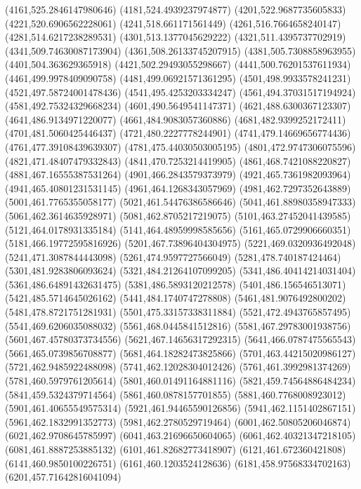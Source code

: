 {(4161,525.2846147980646)
(4181,524.4939237974877)
(4201,522.9687735605833)
(4221,520.6906562228061)
(4241,518.661171561449)
(4261,516.7664658240147)
(4281,514.6217238289531)
(4301,513.1377045629222)
(4321,511.4395737702919)
(4341,509.74630087173904)
(4361,508.26133745207915)
(4381,505.7308858963955)
(4401,504.363629365918)
(4421,502.29493055298667)
(4441,500.76201537611934)
(4461,499.9978409090758)
(4481,499.06921571361295)
(4501,498.9933578241231)
(4521,497.58724001478436)
(4541,495.4253203334247)
(4561,494.37031517194924)
(4581,492.75324329668234)
(4601,490.5649541147371)
(4621,488.6300367123307)
(4641,486.9134971220077)
(4661,484.9083057360886)
(4681,482.9399252172411)
(4701,481.5060425446437)
(4721,480.2227778244901)
(4741,479.14669656774436)
(4761,477.39108439639307)
(4781,475.44030503005195)
(4801,472.9747306075596)
(4821,471.48407479332843)
(4841,470.7253214419905)
(4861,468.7421088220827)
(4881,467.16555387531264)
(4901,466.2843579373979)
(4921,465.7361982093964)
(4941,465.40801231531145)
(4961,464.1268343057969)
(4981,462.7297352643889)
(5001,461.7765355058177)
(5021,461.54476386586646)
(5041,461.88980358947333)
(5061,462.3614635928971)
(5081,462.8705217219075)
(5101,463.27452041439585)
(5121,464.0178931335184)
(5141,464.48959998585656)
(5161,465.0729906660351)
(5181,466.19772595816926)
(5201,467.73896404304975)
(5221,469.0320936492048)
(5241,471.3087844443098)
(5261,474.9597727566049)
(5281,478.740187424464)
(5301,481.9283806093624)
(5321,484.21264107099205)
(5341,486.40414214031404)
(5361,486.64891432631475)
(5381,486.5893120212578)
(5401,486.156546513071)
(5421,485.5714645026162)
(5441,484.1740747278808)
(5461,481.9076492800202)
(5481,478.8721751281931)
(5501,475.33157338311884)
(5521,472.4943765857495)
(5541,469.6206035088032)
(5561,468.0445841512816)
(5581,467.29783001938756)
(5601,467.45780373734556)
(5621,467.14656317292315)
(5641,466.0787475565543)
(5661,465.0739856708877)
(5681,464.18282473825866)
(5701,463.44215020986127)
(5721,462.9485922488098)
(5741,462.12028304012426)
(5761,461.3992981374269)
(5781,460.5979761205614)
(5801,460.01491164881116)
(5821,459.74564886484234)
(5841,459.5324379714564)
(5861,460.0878157701855)
(5881,460.7768008923012)
(5901,461.40655549575314)
(5921,461.94465590126856)
(5941,462.1151402867151)
(5961,462.1832991352773)
(5981,462.2780529719464)
(6001,462.50805206046874)
(6021,462.9708645785997)
(6041,463.21696650604065)
(6061,462.40321347218105)
(6081,461.8887253885132)
(6101,461.82682773418907)
(6121,461.672360421808)
(6141,460.9850100226751)
(6161,460.1203524128636)
(6181,458.97568334702163)
(6201,457.71642816041094)
}
